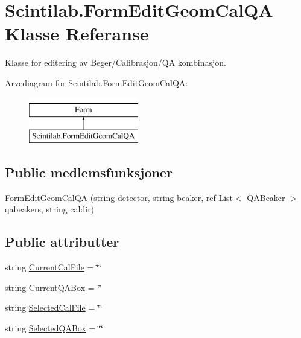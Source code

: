 \hypertarget{class_scintilab_1_1_form_edit_geom_cal_q_a}{\section{Scintilab.\+Form\+Edit\+Geom\+Cal\+Q\+A Klasse Referanse}
\label{class_scintilab_1_1_form_edit_geom_cal_q_a}
}


Klasse for editering av Beger/\+Calibrasjon/\+Q\+A kombinasjon.  


Arvediagram for Scintilab.\+Form\+Edit\+Geom\+Cal\+Q\+A\+:\begin{figure}[H]
\begin{center}
\leavevmode
\includegraphics[height=2.000000cm]{class_scintilab_1_1_form_edit_geom_cal_q_a}
\end{center}
\end{figure}
\subsection*{Public medlemsfunksjoner}
\begin{DoxyCompactItemize}
\item 
\hyperlink{class_scintilab_1_1_form_edit_geom_cal_q_a_ab096632a872fc745853f20eab1f40678}{Form\+Edit\+Geom\+Cal\+Q\+A} (string detector, string beaker, ref List$<$ \hyperlink{class_scintilab_1_1_q_a_beaker}{Q\+A\+Beaker} $>$ qabeakers, string caldir)
\end{DoxyCompactItemize}
\subsection*{Public attributter}
\begin{DoxyCompactItemize}
\item 
string \hyperlink{class_scintilab_1_1_form_edit_geom_cal_q_a_a629f62216840fddcd8d5bc5a9ff7dfa1}{Current\+Cal\+File} = \char`\"{}\char`\"{}
\item 
string \hyperlink{class_scintilab_1_1_form_edit_geom_cal_q_a_ad8fe4f87eb8b5fc08f6877b766d4a161}{Current\+Q\+A\+Box} = \char`\"{}\char`\"{}
\item 
string \hyperlink{class_scintilab_1_1_form_edit_geom_cal_q_a_a3b4e607ddbcc2469e57cc99ba9455398}{Selected\+Cal\+File} = \char`\"{}\char`\"{}
\item 
string \hyperlink{class_scintilab_1_1_form_edit_geom_cal_q_a_a3525769c84679debd1f5181ed70e9089}{Selected\+Q\+A\+Box} = \char`\"{}\char`\"{}
\end{DoxyCompactItemize}
